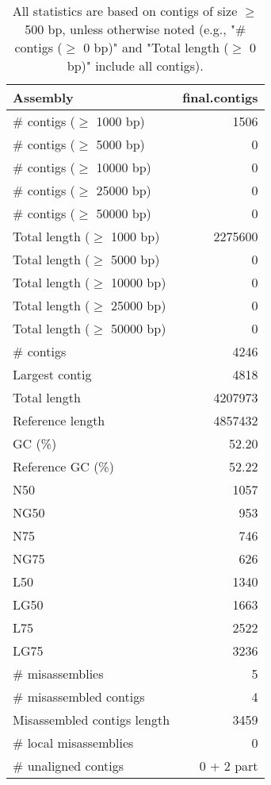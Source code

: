 \documentclass[12pt,a4paper]{article}
\begin{document}
\begin{table}[ht]
\begin{center}
\caption{All statistics are based on contigs of size $\geq$ 500 bp, unless otherwise noted (e.g., "\# contigs ($\geq$ 0 bp)" and "Total length ($\geq$ 0 bp)" include all contigs).}
\begin{tabular}{|l*{1}{|r}|}
\hline
Assembly & final.contigs \\ \hline
\# contigs ($\geq$ 1000 bp) & 1506 \\ \hline
\# contigs ($\geq$ 5000 bp) & 0 \\ \hline
\# contigs ($\geq$ 10000 bp) & 0 \\ \hline
\# contigs ($\geq$ 25000 bp) & 0 \\ \hline
\# contigs ($\geq$ 50000 bp) & 0 \\ \hline
Total length ($\geq$ 1000 bp) & 2275600 \\ \hline
Total length ($\geq$ 5000 bp) & 0 \\ \hline
Total length ($\geq$ 10000 bp) & 0 \\ \hline
Total length ($\geq$ 25000 bp) & 0 \\ \hline
Total length ($\geq$ 50000 bp) & 0 \\ \hline
\# contigs & 4246 \\ \hline
Largest contig & 4818 \\ \hline
Total length & 4207973 \\ \hline
Reference length & 4857432 \\ \hline
GC (\%) & 52.20 \\ \hline
Reference GC (\%) & 52.22 \\ \hline
N50 & 1057 \\ \hline
NG50 & 953 \\ \hline
N75 & 746 \\ \hline
NG75 & 626 \\ \hline
L50 & 1340 \\ \hline
LG50 & 1663 \\ \hline
L75 & 2522 \\ \hline
LG75 & 3236 \\ \hline
\# misassemblies & 5 \\ \hline
\# misassembled contigs & 4 \\ \hline
Misassembled contigs length & 3459 \\ \hline
\# local misassemblies & 0 \\ \hline
\# unaligned contigs & 0 + 2 part \\ \hline

\end{tabular}
\end{center}
\end{table}
\end{document}
